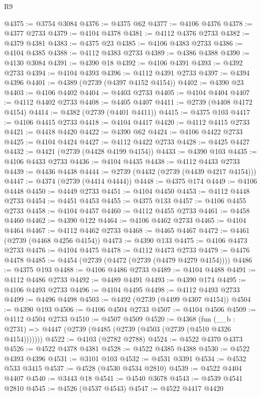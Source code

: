 \begin{lexlean}{R9}
\begin{coremodule}
@4375 := @3754 @3084
@4376 := @4375 @62
@4377 := @4106 @4376
@4378 := @4377 @2733
@4379 := @4104 @4378
@4381 := @4112 @4376 @2733
@4382 := @4379 @4381
@4383 := @4375 @23
@4385 := @4106 @4383 @2733
@4386 := @4104 @4385
@4388 := @4112 @4383 @2733
@4389 := @4386 @4388
@4390 := @4130 @3084
@4391 := @4390 @18
@4392 := @4106 @4391
@4393 := @4392 @2733
@4394 := @4104 @4393
@4396 := @4112 @4391 @2733
@4397 := @4394 @4396
@4401 := @4389 (@2739 (@4397 @4152 @4154))
@4402 := @4390 @23
@4403 := @4106 @4402
@4404 := @4403 @2733
@4405 := @4104 @4404
@4407 := @4112 @4402 @2733
@4408 := @4405 @4407
@4411 := @2739 (@4408 @4172 @4154)
@4414 := @4382 (@2739 (@4401 @4411))
@4415 := @4375 @103
@4417 := @4106 @4415 @2733
@4418 := @4104 @4417
@4420 := @4112 @4415 @2733
@4421 := @4418 @4420
@4422 := @4390 @62
@4424 := @4106 @4422 @2733
@4425 := @4104 @4424
@4427 := @4112 @4422 @2733
@4428 := @4425 @4427
@4432 := @4421 (@2739 (@4428 @4199 @4154))
@4433 := @4390 @103
@4435 := @4106 @4433 @2733
@4436 := @4104 @4435
@4438 := @4112 @4433 @2733
@4439 := @4436 @4438
@4444 := @2739 (@4432 (@2739 (@4439 @4217 @4154)))
@4447 := @4374 (@2739 (@4414 @4444))
@4448 := @4375 @174
@4449 := @4106 @4448
@4450 := @4449 @2733
@4451 := @4104 @4450
@4453 := @4112 @4448 @2733
@4454 := @4451 @4453
@4455 := @4375 @133
@4457 := @4106 @4455 @2733
@4458 := @4104 @4457
@4460 := @4112 @4455 @2733
@4461 := @4458 @4460
@4462 := @4390 @122
@4464 := @4106 @4462 @2733
@4465 := @4104 @4464
@4467 := @4112 @4462 @2733
@4468 := @4465 @4467
@4472 := @4461 (@2739 (@4468 @4256 @4154))
@4473 := @4390 @133
@4475 := @4106 @4473 @2733
@4476 := @4104 @4475
@4478 := @4112 @4473 @2733
@4479 := @4476 @4478
@4485 := @4454 (@2739 (@4472 (@2739 (@4479 @4279 @4154))))
@4486 := @4375 @193
@4488 := @4106 @4486 @2733
@4489 := @4104 @4488
@4491 := @4112 @4486 @2733
@4492 := @4489 @4491
@4493 := @4390 @174
@4495 := @4106 @4493 @2733
@4496 := @4104 @4495
@4498 := @4112 @4493 @2733
@4499 := @4496 @4498
@4503 := @4492 (@2739 (@4499 @4307 @4154))
@4504 := @4390 @193
@4506 := @4106 @4504 @2733
@4507 := @4104 @4506
@4509 := @4112 @4504 @2733
@4510 := @4507 @4509
@4520 := @4368
    (fun (__b : @2731) => @4447 (@2739 (@4485 (@2739 (@4503 (@2739 (@4510 @4326 @4154)))))))
@4522 := @4103 (@2782 @2788)
@4524 := @4522 @4370 @4373
@4526 := @4522 @4378 @4381
@4528 := @4522 @4385 @4388
@4530 := @4522 @4393 @4396
@4531 := @3101 @103
@4532 := @4531 @3391
@4534 := @4532 @533 @3415
@4537 := @4528 (@4530 @4534 @2810)
@4539 := @4522 @4404 @4407
@4540 := @3443 @18
@4541 := @4540 @3678
@4543 := @4539 @4541 @2810
@4545 := @4526 (@4537 @4543)
@4547 := @4522 @4417 @4420

\end{coremodule}
\end{lexlean}
